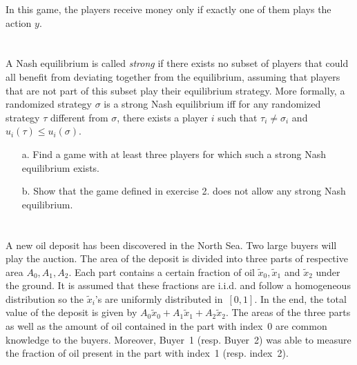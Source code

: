 \documentclass{../ape}
\begin{document}
In this game, the players receive money only if exactly one of them plays the action $y$.

\section{}
A Nash equilibrium is called \emph{strong} if there exists no subset of players that could all benefit from deviating together from the equilibrium, assuming that players that are not part of this subset play their equilibrium strategy. More formally, a randomized strategy $\sigma$ is a strong Nash equilibrium iff for any randomized strategy $\tau$ different from $\sigma$, there exists a player $i$ such that $\tau_i \neq \sigma_i$ and $u_i(\tau) \leq u_i(\sigma)$.
\begin{enumerate}
	\item[a.] Find a game with at least three players for which such a strong Nash equilibrium exists.
	\item[b.] Show that the game defined in exercise 2. does not allow any strong Nash equilibrium.
\end{enumerate}

\begin{solution}

\end{solution}

\section{}
A new oil deposit has been discovered in the North Sea. Two large buyers will play the auction. 
The area of the deposit is divided into three parts of respective area $A_0, A_1, A_2$. Each part contains a certain fraction of oil $\tilde{x}_0, \tilde{x}_1$ and $\tilde{x}_2$ under the ground. It is assumed that these fractions are i.i.d. and follow a homogeneous distribution so the $\tilde{x}_i$'s are uniformly distributed in~$[0, 1]$. In the end, the total value of the deposit is given by $A_0 \tilde{x}_0 + A_1 \tilde{x}_1 + A_2 \tilde{x}_2$. The areas of the three parts as well as the amount of oil contained in the part with index~0 are common knowledge to the buyers. Moreover, Buyer~1 (resp. Buyer~2) was able to measure the fraction of oil present in the part with index~1 (resp. index~2).
\end{document}
